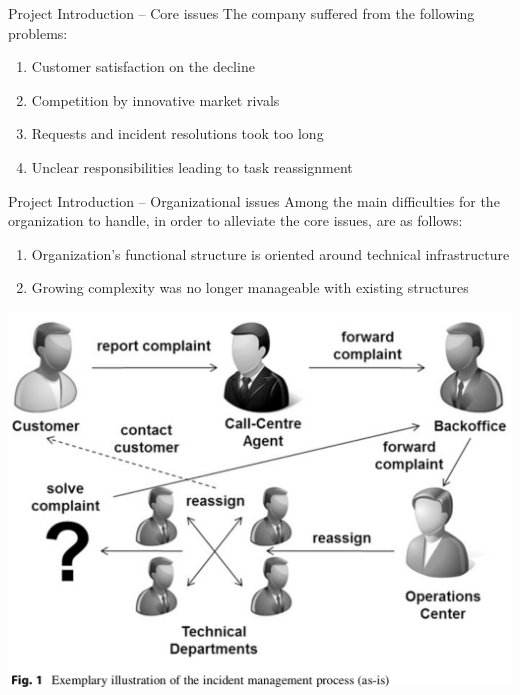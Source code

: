 \documentclass{beamer}
\begin{document}
\begin{frame}{Project Introduction -- Core issues}
    The company suffered from the following problems:
    \begin{enumerate}[$\circ$]
        \item Customer satisfaction on the decline
        \item Competition by innovative market rivals
        \item Requests and incident resolutions took too long
        \item Unclear responsibilities leading to task reassignment
    \end{enumerate}
\end{frame}

\begin{frame}{Project Introduction -- Organizational issues}
    Among the main difficulties for the organization to handle, in order to alleviate the core issues, are as follows:
    \begin{enumerate}[$\circ$]
        \item Organization's functional structure is oriented around technical infrastructure
        \item Growing complexity was no longer manageable with existing structures
    \end{enumerate}
\end{frame}

\begin{frame}
    \begin{center}
        \includegraphics[width=1.0\textwidth]{proj_incidentmgmt.png}
    \end{center}
\end{frame}
\end{document}
